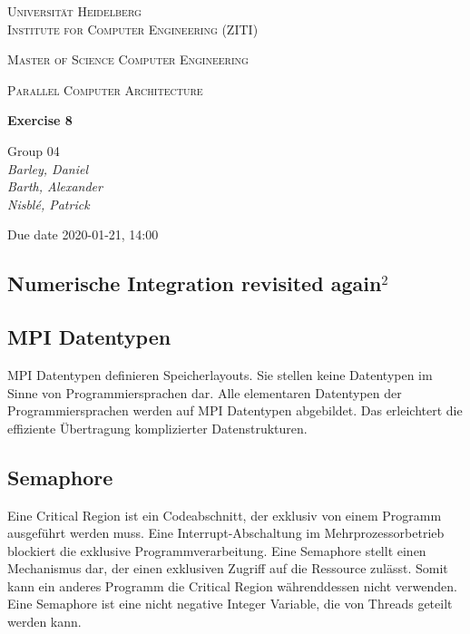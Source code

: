 \documentclass[12pt]{article}
\newcommand{\lecture}{Parallel Computer Architecture}
\newcommand{\exercise}{Exercise 8}
\newcommand{\groupnumber}{Group 04}
\newcommand{\groupmemberslist}{Barley, Daniel\\Barth, Alexander\\Nisblé, Patrick}
\newcommand{\duedate}{2020-01-21, 14:00}
\begin{document}
	\begin{titlepage}
		\centering
		
		{\scshape\LARGE Universität Heidelberg\\Institute for Computer Engineering (ZITI) \par}
		\vspace{1.5cm}
		{\scshape\Large Master of Science Computer Engineering \par}
		\vspace{0.5cm}
		{\scshape\Large \lecture \par}
		\vspace{1.5cm}
		{\huge\bfseries \exercise \par}
		\vspace{2cm}
		{\Large \groupnumber \itshape  \\ \groupmemberslist \par}
		\vfill
		
		
		{\large Due date \duedate \par}
	\end{titlepage}

\setcounter{section}{8}
\subsection{Numerische Integration revisited again$^2$}
\iffalse
\subsubsection{Parallele Implementierung mittels MPI}

@todo: code

\subsubsection{Evaluation und Experimente}

\noindent \textbf{a.}

\noindent \textbf{b.}

\noindent \textbf{c.}
\fi
\subsection{MPI Datentypen}

MPI Datentypen definieren Speicherlayouts.
Sie stellen keine Datentypen im Sinne von Programmiersprachen dar.
Alle elementaren Datentypen der Programmiersprachen werden auf MPI Datentypen abgebildet.
Das erleichtert die effiziente Übertragung komplizierter Datenstrukturen.

\subsection{Semaphore}

Eine Critical Region ist ein Codeabschnitt, der exklusiv von einem Programm ausgeführt werden muss.
Eine Interrupt-Abschaltung im Mehrprozessorbetrieb blockiert die exklusive Programmverarbeitung.
Eine Semaphore stellt einen Mechanismus dar, der einen exklusiven Zugriff auf die Ressource zulässt.
Somit kann ein anderes Programm die Critical Region währenddessen nicht verwenden.
Eine Semaphore ist eine nicht negative Integer Variable, die von Threads geteilt werden kann.
\end{document}
